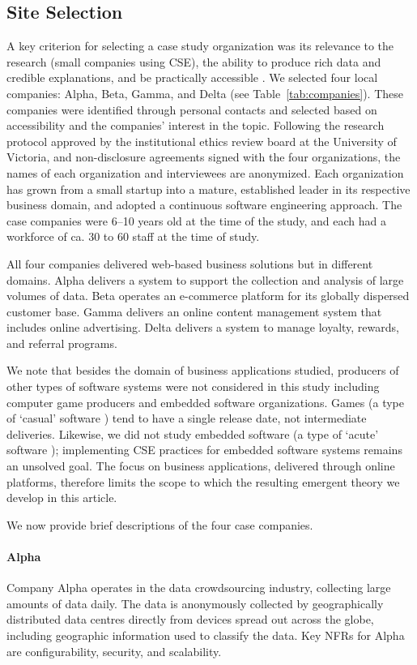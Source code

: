 \documentclass[smallextended]{svjour3}        %
\begin{document}
\subsection{Site Selection}
\label{sec:sites}

A key criterion for selecting a case study organization was its relevance to the research (small companies using CSE), the ability to produce rich data and credible explanations, and be practically accessible \citep{miles1994qualitative}.
We selected four local companies: Alpha, Beta, Gamma, and Delta (see Table~\ref{tab:companies}).
These companies were identified through personal contacts and selected based on accessibility and the companies' interest in the topic. 
Following the research protocol approved by the institutional ethics review board at the University of Victoria, and non-disclosure agreements signed with the four organizations, the names of each organization and interviewees are anonymized.
Each organization has grown from a small startup into a mature, established leader in its respective business domain, and adopted a continuous software engineering approach.
The case companies were 6--10 years old at the time of the study, and each had a workforce of ca. 30 to 60 staff at the time of study.  

All four companies delivered web-based business solutions but in different domains. Alpha delivers a system to support the collection and analysis of large volumes of data. Beta operates an e-commerce platform for its globally dispersed customer base. Gamma delivers an online content management system that includes online advertising. Delta delivers a system to manage loyalty, rewards, and referral programs. 

We note that besides the domain of business applications studied, producers of other types of software systems were not considered in this study including computer game producers and embedded software organizations. Games (a type of `casual' software \citep{meyer2013}) tend to have a single release date, not intermediate deliveries. Likewise, we did not study embedded software (a type of `acute' software \citep{meyer2013}); implementing CSE practices for embedded software systems remains an unsolved goal. The focus on business applications, delivered through online platforms, therefore limits the scope to which the resulting emergent theory we develop in this article. 

We now provide brief descriptions of the four case companies.

\paragraph{Alpha}
Company Alpha operates in the data crowdsourcing industry, collecting large amounts of data daily. The data is anonymously collected by geographically distributed data centres directly from devices spread out across the globe, including geographic information used to classify the data. Key NFRs for Alpha are configurability, security, and scalability. 
\end{document}
